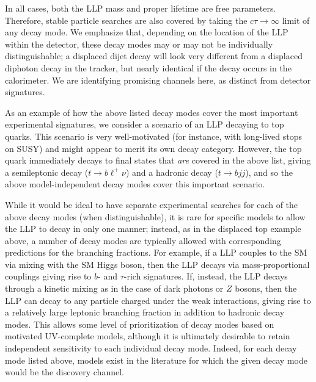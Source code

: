 In all cases, both the LLP mass and proper lifetime are free
parameters.  Therefore, stable particle searches are also covered by
taking the $c\tau\rightarrow\infty$ limit of any decay mode.  We
emphasize that, depending on the location of the LLP within the
detector, these decay modes may or may not be individually
distinguishable; a displaced dijet decay will look very different from
a displaced diphoton decay in the tracker, but nearly identical if the
decay occurs in the calorimeter.  We are identifying promising
channels here, as distinct from detector signatures. 

As an example of how the above listed decay modes cover the most important
experimental signatures, we consider a scenario of an LLP decaying to
top quarks. This scenario is very well-motivated (for instance, with
long-lived stops on SUSY) and might appear to merit its own decay
category. However, the top quark immediately decays to final states
that \emph{are} covered in the above list, giving a semileptonic
decay ($t\rightarrow b\ell^+\nu$) and a hadronic decay ($t\rightarrow
bjj$), and so the above model-independent decay modes cover this
important scenario.

While it would be ideal to have separate experimental searches for
each of the above decay modes (when distinguishable), it is rare for
specific models to allow the LLP to decay in only one manner; instead,
as in the displaced top example above, a number of decay modes are
typically allowed with corresponding predictions for the branching
fractions. For example, if a LLP couples to the SM via mixing with the
SM Higgs boson, then the LLP decays via mass-proportional couplings
giving rise to $b$- and $\tau$-rich signatures. If, instead, the LLP
decays through a kinetic mixing as in the case of dark photons or $Z$
bosons, then the LLP can decay to any particle charged under the weak
interactions, giving rise to a relatively large leptonic branching
fraction in addition to hadronic decay modes. This allows some level
of prioritization of decay modes based on motivated UV-complete
models, although it is ultimately desirable to retain independent
sensitivity to each individual decay mode.  Indeed, for each decay
mode listed above, models exist in the literature for which the given
decay mode would be the discovery channel. 
\linebreak


